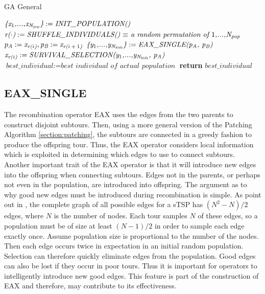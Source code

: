 \begin{algorithm}
\caption{GA General}\label{alg:gagen}
\begin{algorithmic}[1]
\State $\textit{\{x\textsubscript{$1$},...,x\textsubscript{N\textsubscript{pop}}\}} := \textit{INIT\_POPULATION()}$
	\State $\textit{r($\cdot$)} := \textit{SHUFFLE\_INDIVIDUALS() $\equiv$ a random permutation of $1$,...,N\textsubscript{pop} } $
		\State $p_A := \textit{x\textsubscript{r($i$)}} , \textit{p\textsubscript{B}} := \textit{x\textsubscript{r($i+1$)}} $
		\State $\textit{\{y\textsubscript{$1$},...,y\textsubscript{N\textsubscript{kids}}\}} := \textit{EAX\_SINGLE(p\textsubscript{A}, p\textsubscript{B})}$
		\State $\textit{x\textsubscript{r($i$)}} := \textit{SURVIVAL\_SELECTION(y\textsubscript{$1$},...,y\textsubscript{N\textsubscript{kids}}, p\textsubscript{A})} $
	\EndFor
	\State $\textit{best\_individual} := \textit{best individual of actual population}$
\EndWhile
\State \textbf{return} $best\_individual$
\EndProcedure
\end{algorithmic}
\end{algorithm}

\subsection{EAX\_SINGLE}
The recombination operator EAX uses the edges from the two parents to construct disjoint subtours.
Then, using a more general version of the Patching Algorithm \ref{section:patching}, the subtours are connected in a greedy fashion to produce the offspring tour. Thus, the EAX operator considers local information which is exploited in determining which edges to use to connect subtours.\\
Another important trait of the EAX operator is that it will introduce new edges into the offspring when connecting subtours. Edges not in the parents, or perhaps not even in the population, are introduced into offspring. 
The argument as to why good new edges must be introduced during recombination is simple. As point out in \cite{Mathias92geneticoperators}, the complete graph of all possible edges for a sTSP has $(N^2-N)/2$ edges, where $N$ is the number of nodes. Each tour samples $N$ of these edges, so a population must be of size at least $(N-1)/2$ in order to sample each edge exactly once. Assume population size is proportional to the number of the nodes. Then each edge occurs twice in expectation in an initial random population. Selection can therefore quickly eliminate edges from the population. Good edges can also be lost if they occur in poor tours. Thus it is important for operators to intelligently introduce new good edges. This feature is part of the construction of EAX and therefore, may contribute to its effectiveness.\\

